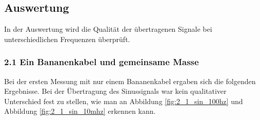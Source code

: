 \documentclass[12pt,a4paper]{article}
\begin{document}
\subsection{Auswertung}

In der Auswertung wird die Qualität der übertragenen Signale bei unterschiedlichen Frequenzen überprüft.

\subsubsection{2.1 Ein Bananenkabel und gemeinsame Masse}

Bei der ersten Messung mit nur einem Bananenkabel ergaben sich die folgenden Ergebnisse.
Bei der Übertragung des Sinussignals war kein qualitativer Unterschied fest zu stellen, wie man an Abbildung \ref{fig:2_1_sin_100hz} und Abbildung \ref{fig:2_1_sin_10mhz} erkennen kann.
\end{document}
